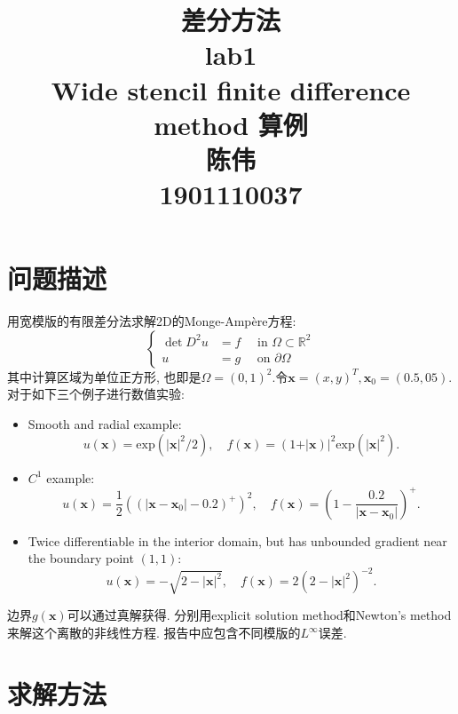 \documentclass[11pt]{article}
\title{差分方法\uppercase\expandafter{\romannumeral2}\\
lab1\\
Wide stencil finite difference method 算例\\
陈伟\\
1901110037}
\begin{document}
\maketitle %
\tableofcontents %

\newpage
\section{问题描述}
用宽模版的有限差分法求解2D的Monge-Ampère方程:
$$\left\{\begin{aligned}
\operatorname{det} D^{2} u &=f \quad \text { in } \Omega \subset \mathbb{R}^{2} \\
u &=g \quad \text { on } \partial \Omega
\end{aligned}\right.$$
其中计算区域为单位正方形, 也即是$\Omega=(0,1)^2.$令$\bm{x}=(x,y)^T,\bm{x}_0=(0.5,05)$. 对于如下三个例子进行数值实验:
\begin{itemize}
\item Smooth and radial example:
$$u(\bm{x})=\text{exp}(\vert{\bm{x}}\vert^2/2),\quad f(\bm{x})=(1+\vert{\bm{x}})\vert^2\text{exp}(\vert{\bm{x}}\vert^2).$$
\item $C^1$ example:
$$u(\boldsymbol{x})=\frac{1}{2}\left(\left(\left|\boldsymbol{x}-\boldsymbol{x}_{0}\right|-0.2\right)^{+}\right)^{2}, \quad f(\boldsymbol{x})=\left(1-\frac{0.2}{\left|\boldsymbol{x}-\boldsymbol{x}_{0}\right|}\right)^{+}.$$
\item Twice differentiable in the interior domain, but has unbounded gradient near the boundary point $(1,1)$:
$$u(\boldsymbol{x})=-\sqrt{2-|\boldsymbol{x}|^{2}}, \quad f(\boldsymbol{x})=2\left(2-|\boldsymbol{x}|^{2}\right)^{-2}.$$
\end{itemize}
边界$g(\bm{x})$可以通过真解获得. 分别用explicit solution method和Newton’s method 来解这个离散的非线性方程. 报告中应包含不同模版的$L^\infty{}$误差.

\section{求解方法}
\end{document}
